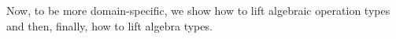\begin{code}%
\>[0]\AgdaSpace{}%
\AgdaSymbol{:}\AgdaSpace{}%
\AgdaSymbol{\{}\AgdaSpace{}%
\AgdaSpace{}%
\AgdaSymbol{:}\AgdaSpace{}%
\AgdaSymbol{\}\{}\AgdaSpace{}%
\AgdaSymbol{:}\AgdaSpace{}%
\AgdaSpace{}%
\AgdaSymbol{\}}\AgdaSpace{}%
\AgdaSpace{}%
\AgdaSymbol{\{}\AgdaSymbol{\}\{}\AgdaSymbol{\}}\AgdaSpace{}%
\AgdaSpace{}%
\AgdaSpace{}%
\AgdaSpace{}%
\AgdaSpace{}%
\<%
\\
\>[0]\AgdaSpace{}%
\AgdaSymbol{=}\AgdaSpace{}%
\AgdaSpace{}%
\AgdaSymbol{\AgdaUnderscore{}}\<%
\\
%
\\[\AgdaEmptyExtraSkip]%
\>[0]\AgdaSpace{}%
\AgdaSymbol{:}\AgdaSpace{}%
\AgdaSymbol{\{}\AgdaSpace{}%
\AgdaSpace{}%
\AgdaSymbol{:}\AgdaSpace{}%
\AgdaSymbol{\}\{}\AgdaSpace{}%
\AgdaSymbol{:}\AgdaSpace{}%
\AgdaSpace{}%
\AgdaSymbol{\}}\AgdaSpace{}%
\AgdaSpace{}%
\AgdaSpace{}%
\AgdaSpace{}%
\AgdaSpace{}%
\AgdaSpace{}%
\AgdaSpace{}%
\AgdaSymbol{(}\AgdaSymbol{\{}\AgdaSymbol{\}\{}\AgdaSymbol{\}}\AgdaSpace{}%
\AgdaSymbol{)}\<%
\\
\>[0]\AgdaSpace{}%
\AgdaSymbol{=}\AgdaSpace{}%
\AgdaSpace{}%
\AgdaSymbol{\AgdaUnderscore{}}\<%
\end{code}
\ccpad
Now, to be more domain-specific, we show how to lift algebraic operation types and then, finally, how to lift algebra types.
\ccpad
